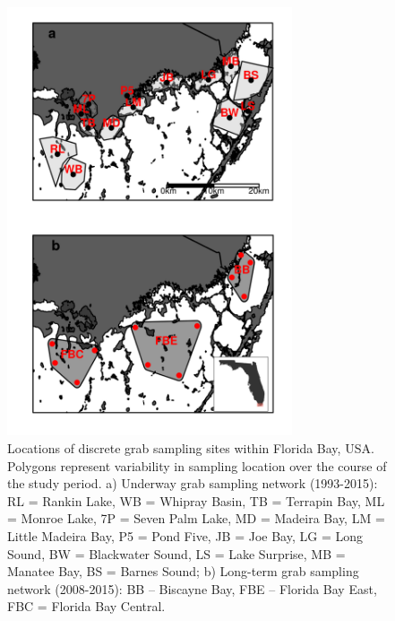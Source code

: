 \newpage

\begin{figure}
  \centering
  \includegraphics[width=0.75\textwidth]{../../figures/fbmap.png}
  \caption{Locations of discrete grab sampling sites within Florida Bay, USA. Polygons represent variability in sampling location over the course of the study period. a) Underway grab sampling network (1993-2015): RL = Rankin Lake, WB = Whipray Basin, TB = Terrapin Bay, ML = Monroe Lake, 7P = Seven Palm Lake, MD = Madeira Bay, LM = Little Madeira Bay, P5 = Pond Five, JB = Joe Bay, LG = Long Sound, BW = Blackwater Sound, LS = Lake Surprise, MB = Manatee Bay, BS = Barnes Sound; b) Long-term grab sampling network (2008-2015): BB – Biscayne Bay, FBE – Florida Bay East, FBC = Florida Bay Central.}
  \label{fig:1}
\end{figure}

\newpage

